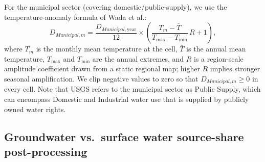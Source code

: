 \documentclass[fleqn,10pt]{wlscirep}
\begin{document}
For the municipal sector (covering domestic/public-supply), we use the temperature-anomaly formula of Wada et al.\cite{Wada2011}:
\begin{equation}
D_{Municipal,m} = \frac{D_{Municipal,\mathrm{year}}}{12} \times \left(\frac{T_m - \bar{T}}{T_{\max} - T_{\min}}\,R + 1\right),
\label{eq:dom-monthly}
\end{equation}
where $T_m$ is the monthly mean temperature at the cell, $\bar{T}$ is the annual mean temperature, $T_{\max}$ and $T_{\min}$ are the annual extremes, and $R$ is a region-scale amplitude coefficient drawn from a static regional map; higher $R$ implies stronger seasonal amplification. We clip negative values to zero so that $D_{Municipal,m} \ge 0$ in every cell. Note that USGS refers to the municipal sector as Public Supply, which can encompass Domestic and Industrial water use that is supplied by publicly owned water rights.

\subsection*{Groundwater vs.\ surface water source-share post-processing}
\end{document}
